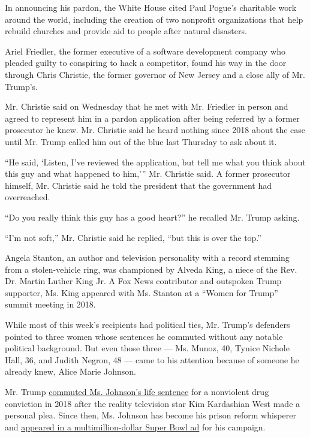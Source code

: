 In announcing his pardon, the White House cited Paul Pogue's charitable
work around the world, including the creation of two nonprofit
organizations that help rebuild churches and provide aid to people after
natural disasters.

Ariel Friedler, the former executive of a software development company
who pleaded guilty to conspiring to hack a competitor, found his way in
the door through Chris Christie, the former governor of New Jersey and a
close ally of Mr. Trump's.

Mr. Christie said on Wednesday that he met with Mr. Friedler in person
and agreed to represent him in a pardon application after being referred
by a former prosecutor he knew. Mr. Christie said he heard nothing since
2018 about the case until Mr. Trump called him out of the blue last
Thursday to ask about it.

``He said, `Listen, I've reviewed the application, but tell me what you
think about this guy and what happened to him,''' Mr. Christie said. A
former prosecutor himself, Mr. Christie said he told the president that
the government had overreached.

``Do you really think this guy has a good heart?'' he recalled Mr. Trump
asking.

``I'm not soft,'' Mr. Christie said he replied, ``but this is over the
top.''

Angela Stanton, an author and television personality with a record
stemming from a stolen-vehicle ring, was championed by Alveda King, a
niece of the Rev. Dr. Martin Luther King Jr. A Fox News contributor and
outspoken Trump supporter, Ms. King appeared with Ms. Stanton at a
``Women for Trump'' summit meeting in 2018.

While most of this week's recipients had political ties, Mr. Trump's
defenders pointed to three women whose sentences he commuted without any
notable political background. But even those three --- Ms. Munoz, 40,
Tynice Nichole Hall, 36, and Judith Negron, 48 --- came to his attention
because of someone he already knew, Alice Marie Johnson.

Mr. Trump
\href{https://www.nytimes.com/2018/06/06/us/politics/trump-alice-johnson-sentence-commuted-kim-kardashian-west.html}{commuted
Ms. Johnson's life sentence} for a nonviolent drug conviction in 2018
after the reality television star Kim Kardashian West made a personal
plea. Since then, Ms. Johnson has become his prison reform whisperer and
\href{https://www.nytimes.com/2020/02/04/us/politics/trump-super-bowl-ad.html}{appeared
in a multimillion-dollar Super Bowl ad} for his campaign.

